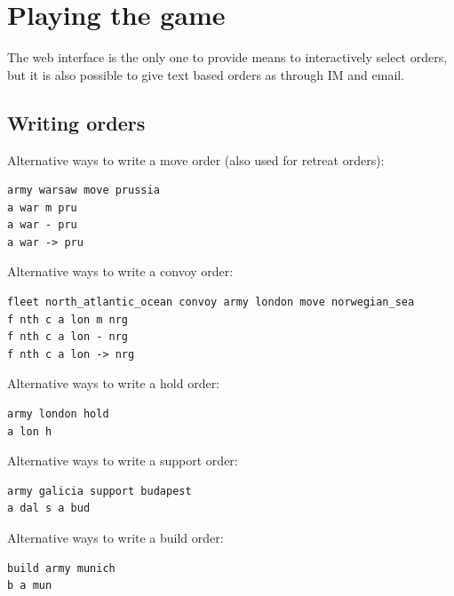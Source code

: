 \documentclass[11pt,a4paper]{report}
\begin{document}
\section{Playing the game}
The web interface is the only one to provide means to interactively select
orders, but it is also possible to give text based orders as through IM and
email.\\

\subsection*{Writing orders}
Alternative ways to write a move order (also used for retreat orders):
\begin{verbatim}
army warsaw move prussia
a war m pru
a war - pru
a war -> pru
\end{verbatim}
Alternative ways to write a convoy order:
\begin{verbatim}
fleet north_atlantic_ocean convoy army london move norwegian_sea
f nth c a lon m nrg
f nth c a lon - nrg
f nth c a lon -> nrg
\end{verbatim}
Alternative ways to write a hold order:
\begin{verbatim}
army london hold
a lon h
\end{verbatim}
Alternative ways to write a support order:
\begin{verbatim}
army galicia support budapest
a dal s a bud
\end{verbatim}
Alternative ways to write a build order:
\begin{verbatim}
build army munich
b a mun
\end{verbatim}
\newpage
\end{document}
